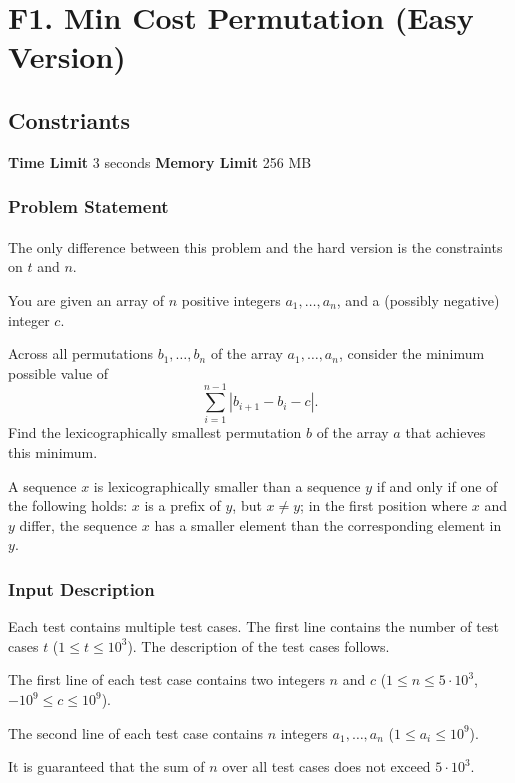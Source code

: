 \documentclass{article}
\begin{document}
\section*{F1. Min Cost Permutation (Easy Version)}
\subsection*{Constriants}
\textbf{Time Limit}
3 seconds
\hfill
\textbf{Memory Limit}
256 MB
\subsubsection*{Problem Statement}
\paragraph{}The only difference between this problem and the hard version is the constraints on $t$ and $n$.

You are given an array of $n$ positive integers $a_1,\dots,a_n$, and a (possibly negative) integer $c$.

Across all permutations $b_1,\dots,b_n$ of the array $a_1,\dots,a_n$, consider the minimum possible value of $$\sum_{i=1}^{n-1} |b_{i+1}-b_i-c|.$$ Find the lexicographically smallest permutation $b$ of the array $a$ that achieves this minimum.

A sequence $x$ is lexicographically smaller than a sequence $y$ if and only if one of the following holds: $x$ is a prefix of $y$, but $x \ne y$; in the first position where $x$ and $y$ differ, the sequence $x$ has a smaller element than the corresponding element in $y$.
\paragraph{}
\subsubsection*{Input Description}Each test contains multiple test cases. The first line contains the number of test cases $t$ ($1 \le t \le 10^3$). The description of the test cases follows.

The first line of each test case contains two integers $n$ and $c$ ($1 \le n \le 5 \cdot 10^3$, $-10^9 \le c \le 10^9$).

The second line of each test case contains $n$ integers $a_1,\dots,a_n$ ($1 \le a_i \le 10^9$).

It is guaranteed that the sum of $n$ over all test cases does not exceed $5 \cdot 10^3$.
\end{document}
